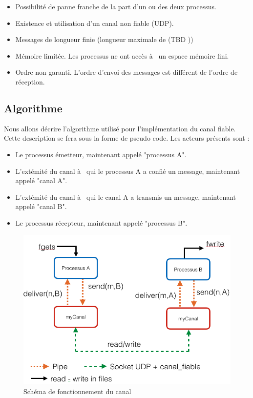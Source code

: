 \documentclass[a4paper, 10pt, french]{article}
\begin{document}
\begin{itemize}
	\item Possibilité de panne franche de la part d'un ou des deux processus.
	\item Existence et utilisation d'un canal non fiable (UDP).
	\item Messages de longueur finie (longueur maximale de  (TBD ))
	\item Mémoire limitée. Les processus ne ont accès à  un espace mémoire fini.
	\item Ordre non garanti. L'ordre d'envoi des messages est différent de l'ordre de réception.
\end{itemize}


\subsection{Algorithme}
Nous allons décrire l'algorithme utilisé pour l'implémentation du canal fiable. Cette description se fera sous la forme de pseudo code. Les acteurs présents sont :
\begin{itemize}
	\item Le processus émetteur, maintenant appelé "processus A".
	\item L'extémité du canal à  qui le processus A a confié un message, maintenant appelé "canal A".
	\item L'extémité du canal à  qui le canal A a transmis un message, maintenant appelé "canal B".
	\item Le processus récepteur, maintenant appelé "processus B". \newline
\end{itemize}

\begin{figure}[!h]
\begin{center}
   	\includegraphics[scale=0.4]{exchange_stack.png}
	\caption{Schéma de fonctionnement du canal}
	\label{fig:canal}
\end{center}
\end{figure}
\end{document}
